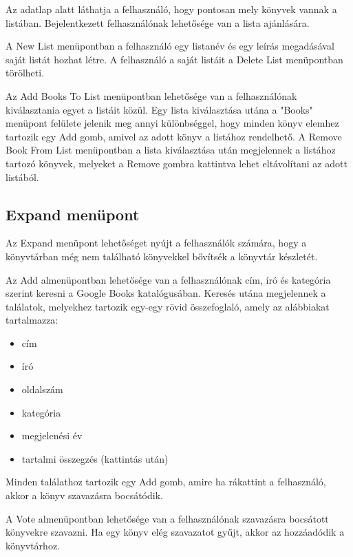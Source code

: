 Az adatlap alatt láthatja a felhasználó, hogy pontosan mely könyvek vannak a listában. Bejelentkezett felhasználónak lehetősége van a lista ajánlására.

\bigskip

A New List menüpontban a felhasználó egy listanév és egy leírás megadásával saját listát hozhat létre. A felhasználó a saját listáit a Delete List menüpontban törölheti.

\bigskip

Az Add Books To List menüpontban lehetősége van a felhasználónak kiválasztania egyet a listáit közül. Egy lista kiválasztása utána a "Books" menüpont felülete jelenik meg annyi különbséggel, hogy minden könyv elemhez tartozik egy Add gomb, amivel az adott könyv a listához rendelhető. A Remove Book From List menüpontban a lista kiválasztása után megjelennek a listához tartozó könyvek, melyeket a Remove gombra kattintva lehet eltávolítani az adott listából.

\subsection{Expand menüpont}
Az Expand menüpont lehetőséget nyújt a felhasználók számára, hogy a könyvtárban még nem található könyvekkel bővítsék a könyvtár készletét. 

\bigskip

Az Add almenüpontban lehetősége van a felhasználónak cím, író és kategória szerint keresni a Google Books katalógusában. Keresés utána megjelennek a találatok, melyekhez tartozik egy-egy rövid összefoglaló, amely az alábbiakat tartalmazza:
\begin{itemize}
    \item cím
    \item író
    \item oldalszám
    \item kategória
    \item megjelenési év
    \item tartalmi összegzés (kattintás után)
\end{itemize}
Minden találathoz tartozik egy Add gomb, amire ha rákattint a felhasználó, akkor a könyv szavazásra bocsátódik.

\bigskip

A Vote almenüpontban lehetősége van a felhasználónak szavazásra bocsátott könyvekre szavazni. Ha egy könyv elég szavazatot gyűjt, akkor az hozzáadódik a könyvtárhoz.

